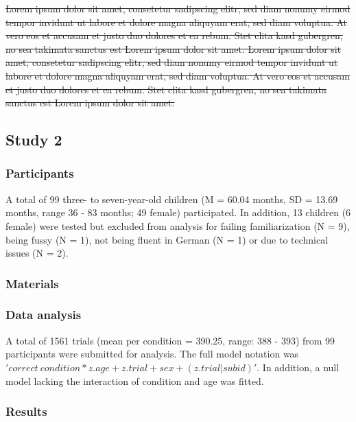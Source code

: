\documentclass[
  man]{apa6}
\begin{document}
\st{Lorem ipsum dolor sit amet, consetetur sadipscing elitr, sed diam nonumy eirmod tempor invidunt ut labore et dolore magna aliquyam erat, sed diam voluptua. At vero eos et accusam et justo duo dolores et ea rebum. Stet clita kasd gubergren, no sea takimata sanctus est Lorem ipsum dolor sit amet. Lorem ipsum dolor sit amet, consetetur sadipscing elitr, sed diam nonumy eirmod tempor invidunt ut labore et dolore magna aliquyam erat, sed diam voluptua. At vero eos et accusam et justo duo dolores et ea rebum. Stet clita kasd gubergren, no sea takimata sanctus est Lorem ipsum dolor sit amet.}

\subsection{Study 2}\label{study-2}

\subsubsection{Participants}\label{participants-1}

A total of 99 three- to seven-year-old children (M = 60.04 months, SD = 13.69 months, range 36 - 83 months; 49 female) participated. In addition, 13 children (6 female) were tested but excluded from analysis for failing familiarization (N = 9), being fussy (N = 1), not being fluent in German (N = 1) or due to technical issues (N = 2).

\subsubsection{Materials}\label{materials}

\subsubsection{Data analysis}\label{data-analysis}

A total of 1561 trials (mean per condition = 390.25, range: 388 - 393) from 99 participants were submitted for analysis. The full model notation was \('correct~condition*z.age+z.trial+sex+(z.trial|subid)'\). In addition, a null model lacking the interaction of condition and age was fitted.

\subsubsection{Results}\label{results-1}
\end{document}
